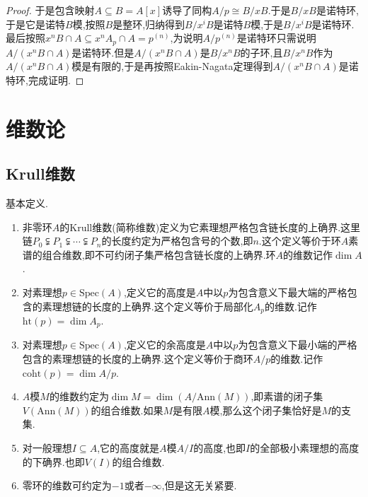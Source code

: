 \begin{enumerate}
\begin{proof}
    	\qquad
    	
    	于是包含映射$A\subseteq B=A[x]$诱导了同构$A/p\cong B/xB$.于是$B/xB$是诺特环,于是它是诺特$B$模,按照$B$是整环,归纳得到$B/x^iB$是诺特$B$模,于是$B/x^iB$是诺特环.最后按照$x^nB\cap A\subseteq x^nA_p\cap A=p^{(n)}$,为说明$A/p^{(n)}$是诺特环只需说明$A/(x^nB\cap A)$是诺特环.但是$A/(x^nB\cap A)$是$B/x^nB$的子环,且$B/x^nB$作为$A/(x^nB\cap A)$模是有限的,于是再按照Eakin-Nagata定理得到$A/(x^nB\cap A)$是诺特环,完成证明.
    \end{proof}
\end{enumerate}



















\newpage
\section{维数论}
\subsection{Krull维数}

基本定义.
\begin{enumerate}
	\item 非零环$A$的Krull维数(简称维数)定义为它素理想严格包含链长度的上确界.这里链$P_0\subsetneqq P_1\subsetneqq\cdots\subsetneqq P_n$的长度约定为严格包含号的个数,即$n$.这个定义等价于环$A$素谱的组合维数,即不可约闭子集严格包含链长度的上确界.环$A$的维数记作$\dim A$.
	\item 对素理想$p\in\mathrm{Spec}(A)$,定义它的高度是$A$中以$p$为包含意义下最大端的严格包含的素理想链的长度的上确界.这个定义等价于局部化$A_p$的维数.记作$\mathrm{ht}(p)=\dim A_p$.
	\item 对素理想$p\in\mathrm{Spec}(A)$,定义它的余高度是$A$中以$p$为包含意义下最小端的严格包含的素理想链的长度的上确界.这个定义等价于商环$A/p$的维数.记作$\mathrm{coht}(p)=\dim A/p$.
	\item $A$模$M$的维数约定为$\dim M=\dim(A/\mathrm{Ann}(M))$,即素谱的闭子集$V(\mathrm{Ann}(M))$的组合维数.如果$M$是有限$A$模,那么这个闭子集恰好是$M$的支集.
	\item 对一般理想$I\subseteq A$,它的高度就是$A$模$A/I$的高度,也即$I$的全部极小素理想的高度的下确界.也即$V(I)$的组合维数.
	\item 零环的维数可约定为$-1$或者$-\infty$,但是这无关紧要.
\end{enumerate}

